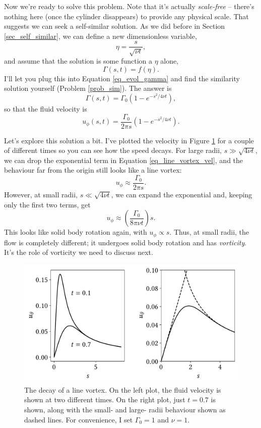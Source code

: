 Now we're ready to solve this problem.  Note that it's actually \emph{scale-free} -- there's nothing here (once the cylinder disappears) to provide any physical scale.  That suggests we can seek a self-similar solution. As we did before in Section \ref{sec_self_similar}, we can define a new dimensionless variable,
\begin{equation}
\eta = \frac{s}{\sqrt{\nu t}},
\end{equation}
and assume that the solution is some function a $\eta$ alone,
\[
\Gamma(s, t) = f(\eta).
\]
I'll let you plug this into Equation \ref{eq_evol_gamma} and find the similarity solution yourself (Problem \ref{prob_sim}).  The answer is
\[
\Gamma(s, t) = \Gamma_0 \left(1 - e^{-s^2 / 4\nu t} \right),
\]
so that the fluid velocity is
\begin{equation}
\label{eq_line_vortex_vel}
u_\phi(s, t) = \frac{\Gamma_0}{2\pi s} \left( 1- e^{-s^2 / 4 \nu t} \right).
\end{equation}

Let's explore this solution a bit.  I've plotted the velocity in Figure \ref{fig_line_vortex} for a couple of different times so you can see how the speed decays.  For large radii, $s \gg \sqrt{4\nu t}$, we can drop the exponential term in Equation \ref{eq_line_vortex_vel}, and the behaviour far from the origin still looks like a line vortex:
\[
u_\phi \approx \frac{\Gamma_0}{2\pi s}.
\]
However, at small radii, $s \ll \sqrt{4 \nu t}$, we can expand the exponential and, keeping only the first two terms, get
\[
u_\phi \approx \left( \frac{\Gamma_0}{8 \pi \nu t} \right) s.
\]
This looks like solid body rotation again, with $u_\phi \propto s$.  Thus, at small radii, the flow is completely different; it undergoes solid body rotation and has \emph{vorticity}.  It's the role of vorticity we need to discuss next.

\begin{figure}
\centering
\includegraphics[width=0.8\linewidth]{Figures/Chapter2/fig_line_vortex}
\caption{The decay of a line vortex.  On the left plot, the fluid velocity is shown at two different times.  On the right plot, just $t=0.7$ is shown, along with the small- and large- radii behaviour shown as dashed lines. For convenience, I set $\Gamma_0 = 1$ and $\nu = 1$.}
\label{fig_line_vortex}
\end{figure}

